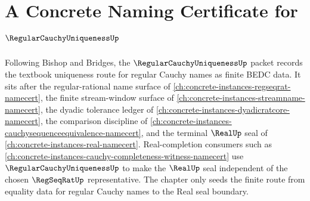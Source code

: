 \chapter{A Concrete Naming Certificate for $\RegularCauchyUniquenessUp$}
\label{ch:concrete-instances-regular-cauchy-uniqueness-namecert}

Following Bishop and Bridges, the $\RegularCauchyUniquenessUp$ packet records the textbook uniqueness route for regular Cauchy names as finite BEDC data. It sits after the regular-rational name surface of \autoref{ch:concrete-instances-regseqrat-namecert}, the finite stream-window surface of \autoref{ch:concrete-instances-streamname-namecert}, the dyadic tolerance ledger of \autoref{ch:concrete-instances-dyadicratcore-namecert}, the comparison discipline of \autoref{ch:concrete-instances-cauchysequenceequivalence-namecert}, and the terminal $\RealUp$ seal of \autoref{ch:concrete-instances-real-namecert}. Real-completion consumers such as \autoref{ch:concrete-instances-cauchy-completeness-witness-namecert} use $\RegularCauchyUniquenessUp$ to make the $\RealUp$ seal independent of the chosen $\RegSeqRatUp$ representative. The chapter only seeds the finite route from equality data for regular Cauchy names to the Real seal boundary.

